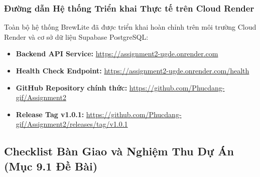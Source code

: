 \documentclass[11pt,a4paper]{article}
\begin{document}
\subsubsection{Đường dẫn Hệ thống Triển khai Thực tế trên Cloud Render}
\vspace{-0.1cm}
{\small Toàn bộ hệ thống BrewLite đã được triển khai hoàn chỉnh trên môi trường Cloud Render và cơ sở dữ liệu Supabase PostgreSQL:}
\begin{itemize}[leftmargin=*,topsep=1pt,itemsep=0pt,parsep=0pt]
    \item \textbf{Backend API Service:} \url{https://assignment2-ugde.onrender.com}
    \item \textbf{Health Check Endpoint:} \url{https://assignment2-ugde.onrender.com/health}
    \item \textbf{GitHub Repository chính thức:} \url{https://github.com/Phucdang-gif/Assignment2}
    \item \textbf{Release Tag v1.0.1:} \url{https://github.com/Phucdang-gif/Assignment2/releases/tag/v1.0.1}
\end{itemize}
\clearpage

\subsection{Checklist Bàn Giao và Nghiệm Thu Dự Án (Mục 9.1 Đề Bài)}
\end{document}

